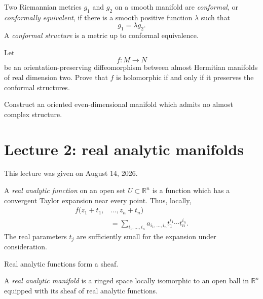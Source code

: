 \begin{definition}
\label{definition-conformal-structure}
Two Riemannian metrics $g_1$ and $g_2$ on a
smooth manifold are {\it conformal}, or
{\it conformally equivalent}, if there is a
smooth positive function $\lambda$ such that
$$
g_1=\lambda g_2.
$$
A {\it conformal structure} is a metric up
to conformal equivalence.
\end{definition}

\begin{exercise}
\label{exercise-surface-conformal}
Let
$$
f:M\longrightarrow N
$$
be an orientation-preserving diffeomorphism
between almost Hermitian manifolds of real
dimension two. Prove that $f$ is
holomorphic if and only if it preserves the
conformal structures.
\end{exercise}

\begin{exercise}
\label{exercise-no-almost-complex}
Construct an oriented even-dimensional
manifold which admits no almost complex
structure.
\end{exercise}
\section{Lecture 2: real analytic
manifolds}
\label{section-lecture-two-real-analytic}

\noindent
This lecture was given on August 14, 2026.

\begin{definition}
\label{definition-real-analytic-function}
A {\it real analytic function} on an open
set $U\subset\mathbb{R}^n$ is a function
which has a convergent Taylor expansion near
every point. Thus, locally,
$$
\begin{aligned}
f(z_1+t_1,&\ldots,z_n+t_n)\\
&=\sum_{i_1,\ldots,i_n}
a_{i_1,\ldots,i_n}
t_1^{i_1}\cdots t_n^{i_n}.
\end{aligned}
$$
The real parameters $t_j$ are sufficiently
small for the expansion under consideration.
\end{definition}

Real analytic functions form a sheaf.

\begin{definition}
\label{definition-real-analytic-manifold}
A {\it real analytic manifold} is a ringed
space locally isomorphic to an open ball in
$\mathbb{R}^n$ equipped with its sheaf of
real analytic functions.
\end{definition}

